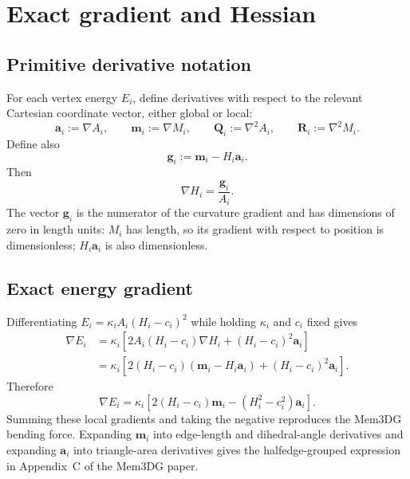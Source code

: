\documentclass[11pt]{article}
\newcommand{\grad}{\nabla}
\newcommand{\Hess}{\nabla^2}
\newcommand{\aV}{\mathbf{a}}
\newcommand{\mV}{\mathbf{m}}
\newcommand{\gV}{\mathbf{g}}
\newcommand{\Q}{\mathbf{Q}}
\newcommand{\Mmat}{\mathbf{R}}
\begin{document}
\section{Exact gradient and Hessian}

\subsection{Primitive derivative notation}

For each vertex energy $E_i$, define derivatives with respect to the relevant Cartesian coordinate vector, either global or local:
\begin{equation}
  \aV_i:=\grad A_i,
  \qquad
  \mV_i:=\grad M_i,
  \qquad
  \Q_i:=\Hess A_i,
  \qquad
  \Mmat_i:=\Hess M_i.
  \label{eq:primitive-derivatives}
\end{equation}
Define also
\begin{equation}
  \boxed{
  \gV_i:=\mV_i-H_i\aV_i.}
  \label{eq:g-def}
\end{equation}
Then
\begin{equation}
  \boxed{
  \grad H_i=\frac{\gV_i}{A_i}.}
  \label{eq:grad-H}
\end{equation}
The vector $\gV_i$ is the numerator of the curvature gradient and has dimensions of zero in length units: $M_i$ has length, so its gradient with respect to position is dimensionless; $H_i\aV_i$ is also dimensionless.

\subsection{Exact energy gradient}

Differentiating $E_i=\kappa_iA_i(H_i-c_i)^2$ while holding $\kappa_i$ and $c_i$ fixed gives
\begin{align}
  \grad E_i
  &=\kappa_i\left[
       2A_i(H_i-c_i)\grad H_i
       +(H_i-c_i)^2\aV_i
     \right]\\
  &=\kappa_i\left[
       2(H_i-c_i)(\mV_i-H_i\aV_i)
       +(H_i-c_i)^2\aV_i
     \right].
\end{align}
Therefore
\begin{equation}
  \boxed{
  \grad E_i
  =
  \kappa_i\left[
    2(H_i-c_i)\mV_i
    -(H_i^2-c_i^2)\aV_i
  \right].}
  \label{eq:local-gradient}
\end{equation}
Summing these local gradients and taking the negative reproduces the Mem3DG bending force.  Expanding $\mV_i$ into edge-length and dihedral-angle derivatives and expanding $\aV_i$ into triangle-area derivatives gives the halfedge-grouped expression in Appendix~C of the Mem3DG paper.
\end{document}
